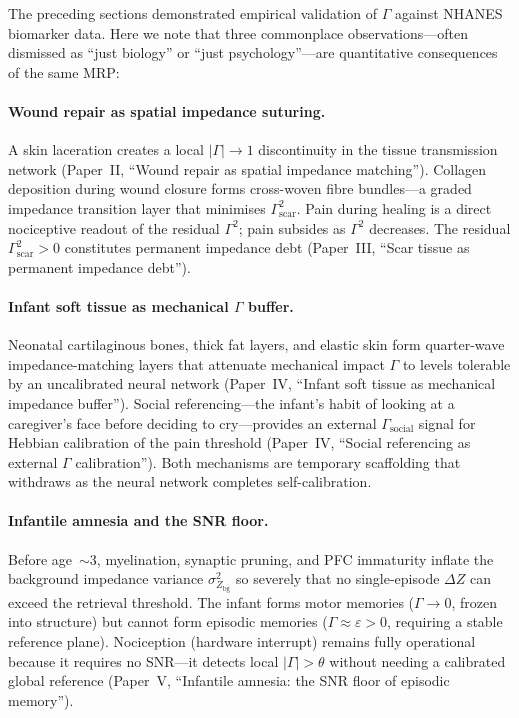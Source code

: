 \documentclass[aps,pre,twocolumn,superscriptaddress,floatfix]{revtex4-2}
\begin{document}
The preceding sections demonstrated empirical validation
of $\Gamma$ against NHANES biomarker data.
Here we note that three commonplace observations---often
dismissed as ``just biology'' or ``just psychology''---are
quantitative consequences of the same MRP:

\paragraph{Wound repair as spatial impedance suturing.}
A skin laceration creates a local $|\Gamma|\to 1$
discontinuity in the tissue transmission network
(Paper~II, ``Wound repair as spatial impedance matching'').
Collagen deposition during wound closure forms
cross-woven fibre bundles---a graded impedance transition
layer that minimises $\Gamma^2_{\text{scar}}$.
Pain during healing is a direct nociceptive readout of
the residual $\Gamma^2$; pain subsides as $\Gamma^2$
decreases.
The residual $\Gamma^2_{\text{scar}}>0$ constitutes
permanent impedance debt
(Paper~III, ``Scar tissue as permanent impedance debt'').

\paragraph{Infant soft tissue as mechanical $\Gamma$ buffer.}
Neonatal cartilaginous bones, thick fat layers, and
elastic skin form quarter-wave impedance-matching layers
that attenuate mechanical impact $\Gamma$ to levels
tolerable by an uncalibrated neural network
(Paper~IV, ``Infant soft tissue as mechanical impedance buffer'').
Social referencing---the infant's habit of looking at a
caregiver's face before deciding to cry---provides an
external $\Gamma_{\text{social}}$ signal for Hebbian
calibration of the pain threshold
(Paper~IV, ``Social referencing as external $\Gamma$ calibration'').
Both mechanisms are temporary scaffolding that withdraws
as the neural network completes self-calibration.

\paragraph{Infantile amnesia and the SNR floor.}
Before age~$\sim$3, myelination, synaptic pruning,
and PFC immaturity inflate the background impedance
variance $\sigma^2_{Z_{\text{bg}}}$ so severely that no
single-episode $\Delta Z$ can exceed the retrieval
threshold.
The infant forms motor memories ($\Gamma\to 0$, frozen
into structure) but cannot form episodic memories
($\Gamma\approx\varepsilon>0$, requiring a stable
reference plane).  Nociception (hardware interrupt)
remains fully operational because it requires no SNR---it
detects local $|\Gamma|>\theta$ without needing a
calibrated global reference
(Paper~V, ``Infantile amnesia: the SNR floor of episodic memory'').
\end{document}
